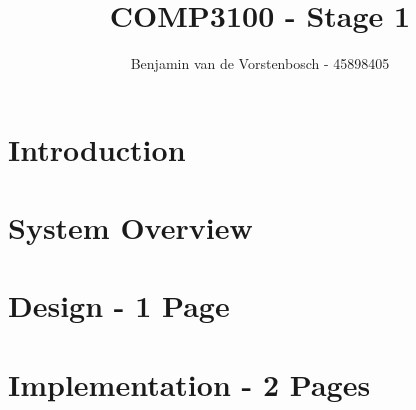 \documentclass[10pt]{article}
\title{COMP3100 - Stage 1}
\author{Benjamin van de Vorstenbosch - 45898405}
\begin{document}
\maketitle

\section{Introduction}


\section{System Overview}


\section{Design - 1 Page}


\section{Implementation - 2 Pages}


\raggedright
\nocite{*}
\printbibliography[]
\end{document}
